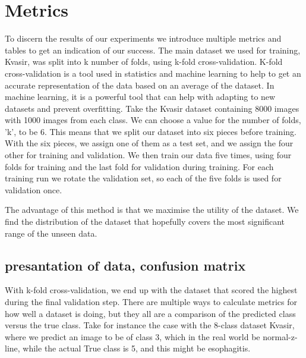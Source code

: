    
\FloatBarrier



\section{Metrics}
To discern the results of our experiments we introduce multiple metrics and tables to get an indication of our success. 
The main dataset we used for training, Kvasir, was split into k number of folds, using k-fold cross-validation. 
K-fold cross-validation is a tool used in statistics and machine learning to help to get an accurate representation of the data based on an average of the dataset.  In machine learning, it is a powerful tool that can help with adapting to new datasets and prevent overfitting. 
Take the Kvasir dataset containing 8000 images with 1000 images from each class. We can choose a value for the number of folds, 'k', to be 6. This means that we split our dataset into six pieces before training.  With the six pieces, we assign one of them as a test set, and we assign the four other for training and validation. We then train our data five times, using four folds for training and the last fold for validation during training. For each training run we rotate the validation set, so each of the five folds is used for validation once. 

The advantage of this method is that we maximise the utility of the dataset. We find the distribution of the dataset that hopefully covers the most significant range of the unseen data. 
\subsection{presantation of data, confusion matrix}
With k-fold cross-validation, we end up with the dataset that scored the highest during the final validation step.  There are multiple ways to calculate metrics for how well a dataset is doing,  but they all are a comparison of the predicted class versus the true class.  
Take for instance the case with the 8-class dataset Kvasir, where we predict an image to be of class 3, which in the real world be normal-z-line, while the actual True class is 5, and this might be esophagitis.

